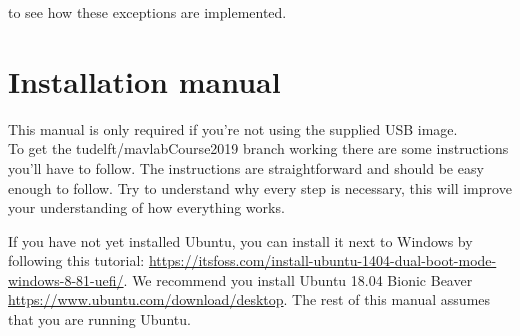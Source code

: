 \documentclass{article}
\begin{document}
 to see how these exceptions are implemented. 

\clearpage
\section*{Installation manual}

This manual is only required if you're not using the supplied USB image.\\

\noindent To get the tudelft/mavlabCourse2019 branch working there are some instructions you'll have to follow. The instructions are straightforward and should be easy enough to follow. Try to understand why every step is necessary, this will improve your understanding of how everything works.

\medskip
If you have not yet installed Ubuntu, you can install it next to Windows by following this tutorial: \url{https://itsfoss.com/install-ubuntu-1404-dual-boot-mode-windows-8-81-uefi/}. We recommend you install Ubuntu 18.04 Bionic Beaver \url{https://www.ubuntu.com/download/desktop}. The rest of this manual assumes that you are running Ubuntu.
\end{document}
